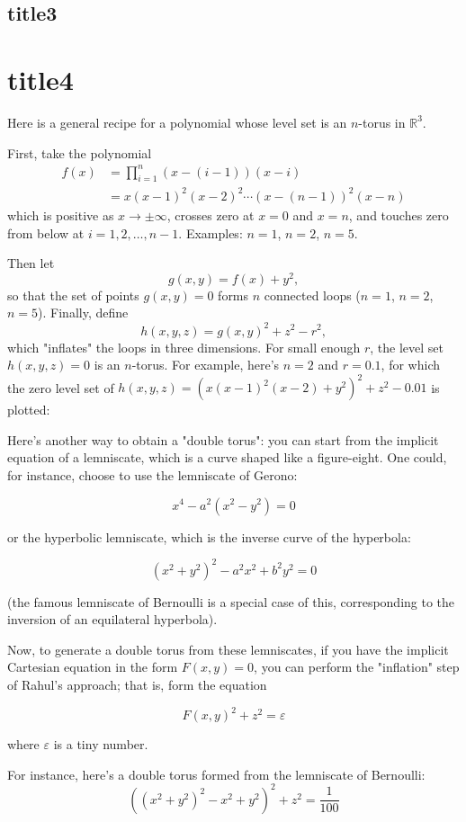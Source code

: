 	\subsection*{title3}
	\section{title4}
	
	Here is a general recipe for a polynomial whose level set is an $n$-torus in $\mathbb R^3$.
	
	First, take the polynomial $$\begin{align}f(x) &= \prod_{i=1}^n (x-(i-1))(x-i) \\ &= x(x-1)^2(x-2)^2\cdots(x-(n-1))^2(x-n)\end{align}$$ which is positive as $x\to\pm\infty$, crosses zero at $x=0$ and $x=n$, and touches zero from below at $i = 1, 2, \ldots, n-1$. Examples: $n=1$, $n=2$, $n=5$.
	
	Then let $$g(x,y) = f(x) + y^2,$$ so that the set of points $g(x,y)=0$ forms $n$ connected loops ($n=1$, $n=2$, $n=5$). Finally, define $$h(x,y,z) = g(x,y)^2 + z^2 - r^2,$$ which "inflates" the loops in three dimensions. For small enough $r$, the level set $h(x,y,z) = 0$ is an $n$-torus. For example, here's $n=2$ and $r=0.1$, for which the zero level set of $h(x,y,z) = \left(x(x-1)^2(x-2)+y^2\right)^2+z^2 - 0.01$ is plotted:
	
	Here's another way to obtain a "double torus": you can start from the implicit equation of a lemniscate, which is a curve shaped like a figure-eight. One could, for instance, choose to use the lemniscate of Gerono:
	
	$$x^4-a^2(x^2-y^2)=0$$
	
	or the hyperbolic lemniscate, which is the inverse curve of the hyperbola:
	
	$$(x^2+y^2)^2-a^2x^2+b^2y^2=0$$
	
	(the famous lemniscate of Bernoulli is a special case of this, corresponding to the inversion of an equilateral hyperbola).
	
	Now, to generate a double torus from these lemniscates, if you have the implicit Cartesian equation in the form $F(x,y)=0$, you can perform the "inflation" step of Rahul's approach; that is, form the equation
	
	$$F(x,y)^2+z^2=\varepsilon$$
	
	where $\varepsilon$ is a tiny number.
	
	For instance, here's a double torus formed from the lemniscate of Bernoulli: $$((x^2+y^2)^2-x^2+y^2)^2+z^2=\frac1{100}$$
	
